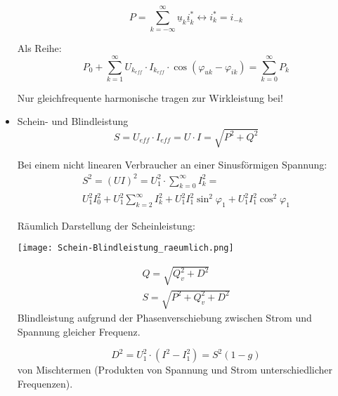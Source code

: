 \begin{itemize}
\[        \]
        \[
            P = \sum_{k=-\infty}^{\infty}\underline{u}_k \underline{i}_k^* \leftrightarrow i_k^* = i_{-k}
        \]
        \begin{mdframed}[style=exercise]
            Als Reihe:
            \[
                P_0 + \sum_{k=1}^{\infty} U_{k_{eff}}\cdot
                I_{k_{eff}}\cdot\cos(\varphi_{uk}-\varphi_{ik}) = \sum_{k=0}^{\infty}P_k
            \]
        \end{mdframed}
        Nur gleichfrequente harmonische tragen zur Wirkleistung bei!
    \item Schein- und Blindleistung\\
        \[
            \boxed{S = U_{eff}\cdot I_{eff} = U\cdot I = \sqrt{P^2+Q^2}}
        \]
        \begin{mdframed}[style=exercise]
        Bei einem nicht linearen Verbraucher an einer Sinusförmigen Spannung:
        \vspace{-1em}
            \begin{multline*}
                S^{2}=(U I)^{2}=U_{1}^{2} \cdot \sum_{k=0}^{\infty} I_{k}^{2}=\\U_{1}^{2} I_{0}^{2}+U_{1}^{2} \sum_{k=2}^{\infty} I_{k}^{2}+U_{1}^{2} I_{1}^{2} \sin ^{2} \varphi_{1}+U_{1}^{2} I_{1}^{2} \cos ^{2} \varphi_{1}
            \end{multline*}
        \end{mdframed}

        Räumlich Darstellung der Scheinleistung:
        \begin{center}
            \vspace{-1em}
            \texttt{[image: Schein-Blindleistung\_raeumlich.png]}
            \vspace{-0.7em}
        \end{center}

        \begin{mdframed}[style=exercise,frametitle=Verschiebungs- Feldblindleistung $Q_v$]
            \vspace{-1em}
            \begin{gather*}
                Q = \sqrt{Q^2_v + D^2}\\
                S = \sqrt{P^2+Q^2_v + D^2}
            \end{gather*}
            Blindleistung aufgrund der Phasenverschiebung zwischen Strom und
            Spannung gleicher Frequenz.
        \end{mdframed}
        \begin{mdframed}[style=exercise,frametitle=Verzerrungblindleistun $D$]
            \[
                D^2 = U_1^2\cdot(I^2-I_1^2) = S^2(1-g)
            \]
            von Mischtermen (Produkten von Spannung und Strom unterschiedlicher
            Frequenzen).
        \end{mdframed}
\end{itemize}

